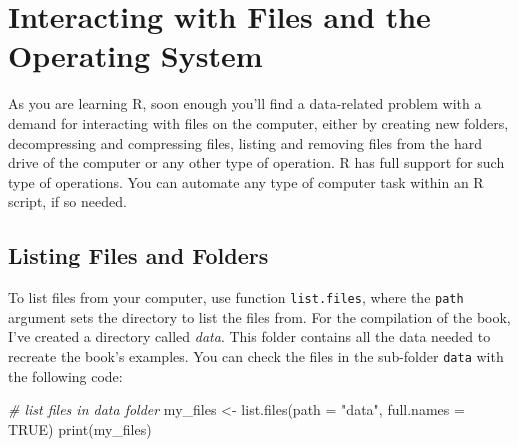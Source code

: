 \documentclass[
  12pt,
]{book}
\newenvironment{Shaded}{\begin{snugshade}}{\end{snugshade}}
\newcommand{\AttributeTok}[1]{\textcolor[rgb]{0.61,0.61,0.61}{#1}}
\newcommand{\CommentTok}[1]{\textcolor[rgb]{0.37,0.37,0.37}{\textit{#1}}}
\newcommand{\ConstantTok}[1]{\textcolor[rgb]{0,0,0}{#1}}
\newcommand{\FunctionTok}[1]{\textcolor[rgb]{0,0,0}{#1}}
\newcommand{\NormalTok}[1]{#1}
\newcommand{\OtherTok}[1]{\textcolor[rgb]{0.37,0.37,0.37}{#1}}
\newcommand{\StringTok}[1]{\textcolor[rgb]{0.5,0.5,0.5}{#1}}
\begin{document}
\hypertarget{interacting-with-files-and-the-operating-system}{%
\section{Interacting with Files and the Operating System}\label{interacting-with-files-and-the-operating-system}}

As you are learning R, soon enough you'll find a data-related problem with a demand for interacting with files on the computer, either by creating new folders, decompressing and compressing files, listing and removing files from the hard drive of the computer or any other type of operation. R has full support for such type of operations. You can automate any type of computer task within an R script, if so needed.

\hypertarget{listing-files-and-folders}{%
\subsection{Listing Files and Folders}\label{listing-files-and-folders}}

To list files from your computer, use function \texttt{list.files}, where the \texttt{path} argument sets the directory to list the files from. For the compilation of the book, I've created a directory called \emph{data}. This folder contains all the data needed to recreate the book's examples. You can check the files in the sub-folder \texttt{data} with the following code: 

\begin{Shaded}
\begin{Highlighting}[]
\CommentTok{\# list files in data folder}
\NormalTok{my\_files }\OtherTok{\textless{}{-}} \FunctionTok{list.files}\NormalTok{(}\AttributeTok{path =} \StringTok{"data"}\NormalTok{, }\AttributeTok{full.names =} \ConstantTok{TRUE}\NormalTok{)}
\FunctionTok{print}\NormalTok{(my\_files)}
\end{Highlighting}
\end{Shaded}
\end{document}
